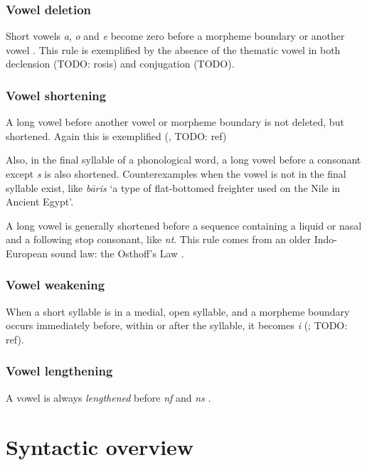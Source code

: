 \documentclass[a4paper, oneside, 12pt]{report}
\newcommand*{\citesec}[1]{\S~{#1}}
\newcommand*{\citepage}[1]{p.~{#1}}
\newcommand{\form}[1]{\emph{#1}}
\newcommand{\translate}[1]{`#1'}
\begin{document}
\subsection{Vowel deletion}\label{sec:phonology.rule.deletion}

Short vowels \form{a}, \form{o} and \form{e} 
become zero before a morpheme boundary or another vowel
\citep[\citesec{8.3}]{oniga2014latin}.
This rule is exemplified by the absence 
of the thematic vowel in both declension (TODO: rosis)
and conjugation (TODO).

\subsection{Vowel shortening}\label{sec:phonology.rule.shortening}

A long vowel before another vowel or morpheme boundary 
is not deleted, but shortened.
Again this is exemplified (, TODO: ref)

Also, in the final syllable of a phonological word,
a long vowel before a consonant except \form{s} is also shortened.
Counterexamples when the vowel is not in the final syllable exist,
like \form{b\={a}ris} \translate{a type of flat-bottomed freighter used on the Nile in Ancient Egypt}.

A long vowel is generally shortened before a sequence 
containing a liquid or nasal and a following stop consonant,
like \form{nt}.
This rule comes from an older Indo-European sound law: 
the Osthoff's Law
\citep[\citepage{55}]{oniga2014latin}.

\subsection{Vowel weakening}

When a short syllable is in a medial, open syllable,
and a morpheme boundary occurs immediately before, within or after the syllable,
it becomes \form{i} 
(\citealt[\citepage{55}]{oniga2014latin}; TODO: ref).

\subsection{Vowel lengthening}

A vowel is always \emph{lengthened} before \form{nf} and \form{ns}
\citep[\citepage{55}]{oniga2014latin}.

\chapter{Syntactic overview}
\end{document}
